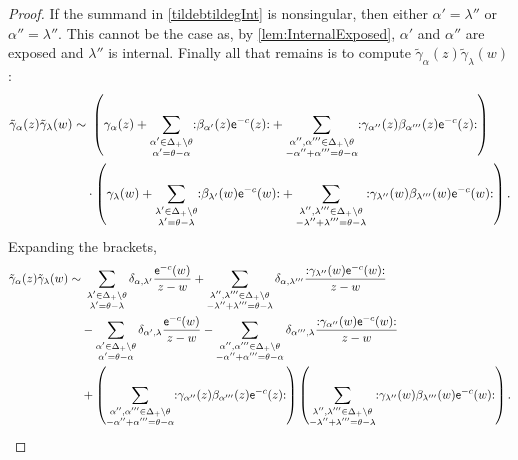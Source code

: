 \documentclass[10pt,a4paper]{amsart}
\numberwithin{equation}{section}
\newcommand{\ee}{\mathsf{e}}   %
\newcommand{\no}[1]{\mathopen{:} #1 \mathclose{:}} %
\newcommand{\proots}{\Delta_+}                                       %
\newcommand{\hroot}{\theta}                                          %
\theoremstyle{plain}
\begin{document}
\begin{proof}
    If the summand in \eqref{tildebtildegInt} is nonsingular, then either $\alpha'=\lambda''$ or $\alpha''=\lambda''$. This cannot be the case as, by \cref{lem:InternalExposed}, $\alpha'$ and $\alpha''$ are exposed and $\lambda''$ is internal. Finally all that remains is to compute $\tilde{\gamma}_\alpha(z) \tilde{\gamma}_\lambda(w)$:
    \begin{align}
        \tilde{\gamma}_\alpha(z) \tilde{\gamma}_\lambda(w) \sim& \ 
    \left(\gamma_\alpha(z) 
    + \sum_{\substack{\alpha' \in \proots \setminus \hroot \\ \alpha'=\hroot-\alpha}}\no{\beta_{\alpha'}(z)\ee^{-c}(z)}
    + \sum_{\substack{\alpha'',\alpha''' \in \proots \setminus \hroot \\ -\alpha''+\alpha'''=\hroot-\alpha}}\no{\gamma_{\alpha''}(z)\beta_{\alpha'''}(z)\ee^{-c}(z)}\right)\\
    &\cdot\left(\gamma_\lambda(w) 
    + \sum_{\substack{\lambda' \in \proots \setminus \hroot \\ \lambda'=\hroot-\lambda}}\no{\beta_{\lambda'}(w)\ee^{-c}(w)}
    + \sum_{\substack{\lambda'',\lambda''' \in \proots \setminus \hroot \\ -\lambda''+\lambda'''=\hroot-\lambda}}\no{\gamma_{\lambda''}(w)\beta_{\lambda'''}(w)\ee^{-c}(w)}\right). \notag
    \end{align}
    Expanding the brackets,
    \begin{align}
        \tilde{\gamma}_\alpha(z) \tilde{\gamma}_\lambda(w) \sim&\ 
        \sum_{\substack{\lambda' \in \proots \setminus \hroot \\ \lambda'=\hroot-\lambda}}\delta_{\alpha,\lambda'}\frac{\ee^{-c}(w)}{z-w} + 
        \sum_{\substack{\lambda'',\lambda''' \in \proots \setminus \hroot \\ -\lambda''+\lambda'''=\hroot-\lambda}}\delta_{\alpha,\lambda'''}\frac{\no{\gamma_{\lambda''}(w)\ee^{-c}(w)}}{z-w}\\ &-
        \sum_{\substack{\alpha' \in \proots \setminus \hroot \\ \alpha'=\hroot-\alpha}}\delta_{\alpha',\lambda}\frac{\ee^{-c}(w)}{z-w} - 
        \sum_{\substack{\alpha'',\alpha''' \in \proots \setminus \hroot \\ -\alpha''+\alpha'''=\hroot-\alpha}}\delta_{\alpha''',\lambda}\frac{\no{\gamma_{\alpha''}(w)\ee^{-c}(w)}}{z-w} \notag\\&+
        \left(\sum_{\substack{\alpha'',\alpha''' \in \proots \setminus \hroot \\ -\alpha''+\alpha'''=\hroot-\alpha}}\no{\gamma_{\alpha''}(z)\beta_{\alpha'''}(z)\ee^{-c}(z)}\right)
        \left(\sum_{\substack{\lambda'',\lambda''' \in \proots \setminus \hroot \\ -\lambda''+\lambda'''=\hroot-\lambda}}\no{\gamma_{\lambda''}(w)\beta_{\lambda'''}(w)\ee^{-c}(w)}\right). \notag
    \end{align}
    

\end{proof}
\end{document}
